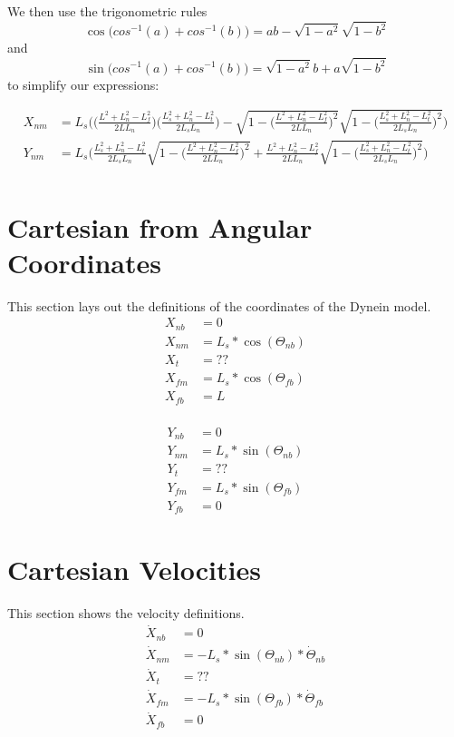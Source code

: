 \documentclass[11pt, landscape]{article}
\begin{document}
We then use the trigonometric rules $$\cos\Big(cos^{-1}(a)+cos^{-1}(b)\Big) = ab - \sqrt{1-a^2}\sqrt{1-b^2}$$ and $$\sin\Big(cos^{-1}(a)+cos^{-1}(b)\Big) = \sqrt{1-a^2}b+a\sqrt{1-b^2}$$ to simplify our expressions:

\begin{align}
  X_{nm} &= L_{s}\Bigg( \Big(\frac{L^2+L_{n}^2-L_{f}^2}{2LL_{n}}\Big)\Big(\frac{L_{s}^2+L_{n}^2-L_{t}^2}{2L_{s}L_{n}}\Big) - \sqrt{1-\bigg(\frac{L^2+L_{n}^2-L_{f}^2}{2LL_{n}}\bigg)^2}\sqrt{1-\bigg(\frac{L_{s}^2+L_{n}^2-L_{t}^2}{2L_{s}L_{n}}\bigg)^2} \Bigg) \\
  Y_{nm} &= L_{s}\Bigg(\frac{L_{s}^2+L_{n}^2-L_{t}^2}{2L_{s}L_{n}}\sqrt{1-\bigg(\frac{L^2+L_{n}^2-L_{f}^2}{2LL_{n}}\bigg)^2}+\frac{L^2+L_{n}^2-L_{f}^2}{2LL_{n}}\sqrt{1-\bigg(\frac{L_{s}^2+L_{n}^2-L_{t}^2}{2L_{s}L_{n}}\bigg)^2} \Bigg) \\
\end{align}

\section{Cartesian from Angular Coordinates}
This section lays out the definitions of the coordinates of the Dynein model. \\
\begin{align}
  X_{nb} &= 0 \\
  X_{nm} &= L_{s}*\cos(\Theta_{nb}) \\
  X_{t}  &= ?? \\
  X_{fm} &= L_{s}*\cos(\Theta_{fb}) \\
  X_{fb} &= L \\
\end{align}

\begin{align}
  Y_{nb} &= 0 \\
  Y_{nm} &= L_{s}*\sin(\Theta_{nb}) \\
  Y_{t}  &= ?? \\
  Y_{fm} &= L_{s}*\sin(\Theta_{fb}) \\
  Y_{fb} &= 0
\end{align}

\section{Cartesian Velocities}
This section shows the velocity definitions. \\
\begin{align}
  \dot{X}_{nb} &= 0 \\
  \dot{X}_{nm} &= -L_{s}*\sin(\Theta_{nb})*\dot{\Theta}_{nb} \\
  \dot{X}_{t } &= ?? \\
  \dot{X}_{fm} &= -L_{s}*\sin(\Theta_{fb})*\dot{\Theta}_{fb} \\
  \dot{X}_{fb} &= 0
\end{align}  
             
\end{document}
